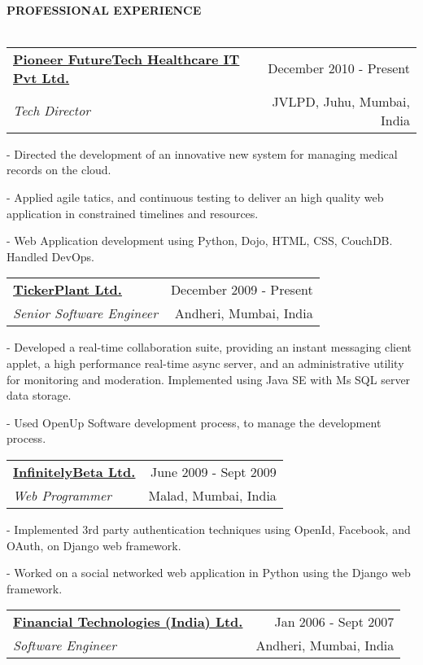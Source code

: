 \documentclass[10pt]{article}
\makeatletter
\newcommand{\lineunder}{\vspace*{-10pt} \\ \hspace*{-18pt} \hrulefill \vspace{2pt}\\}
\newcommand{\header}[1]{{\hspace*{-15pt}\vspace*{-0pt}\\ \uppercase{\textbf {#1}}}  \lineunder}
\newcommand{\employer}[4]{ 
        \vspace*{6pt}
	\begin{tabular*}{\textwidth}{l@{\extracolsep{\fill}}r}
	\textbf{#1} & #2 \\
                #3  & #4 \\ 
	\end{tabular*}
}
\newenvironment{achievements}{
        \vspace{-0pt}
        \begin{list}
        {}
        {\topsep 0pt \itemsep -3pt}
}
{
        \end{list}
}
\makeatother
\begin{document}
\header{Professional Experience}
\employer{\href{http://www.pfhit.com/}{Pioneer FutureTech Healthcare IT Pvt Ltd.}}{December 2010 - Present}{\emph{Tech Director}} {JVLPD, Juhu, Mumbai, India}
	\begin{achievements}
                \item[-] Directed the development of an innovative new system for managing medical records on the cloud.
                \item[-] Applied agile tatics, and continuous testing to deliver an high quality web application in constrained timelines and resources.
                \item[-] Web Application development using Python, Dojo, HTML, CSS, CouchDB. Handled DevOps.
	\end{achievements}
\employer{\href{http://www.Tickerplantindia.com/}{TickerPlant Ltd.}}{December 2009 - Present}{\emph{Senior Software Engineer}} {Andheri, Mumbai, India}
	\begin{achievements}
                \item[-] Developed a real-time collaboration suite, providing an instant messaging client applet, a high performance real-time async server, and an administrative utility for monitoring and moderation. Implemented using Java SE with Ms SQL server data storage.
                \item[-] Used OpenUp Software development process, to manage the development process.
	\end{achievements}
\employer{\href{http://www.InfinitelyBeta.com/}{InfinitelyBeta Ltd.}}{June 2009 - Sept 2009}{\emph{Web Programmer}} {Malad, Mumbai, India}
	\begin{achievements}
                \item[-] Implemented 3rd party authentication techniques using OpenId, Facebook, and OAuth, on Django web framework.
                \item[-] Worked on a social networked web application in Python using the Django web framework.
	\end{achievements}
\employer{\href{http://www.ftindia.com/}{Financial Technologies (India) Ltd.}}{Jan 2006 - Sept 2007}{\emph{Software Engineer}} {Andheri, Mumbai, India}
\end{document}

